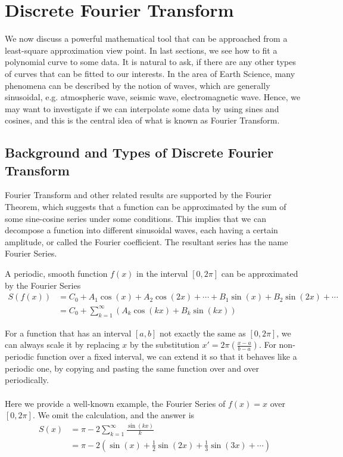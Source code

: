\chapter{Discrete Fourier Transform}
We now discuss a powerful mathematical tool that can be approached from a least-square approximation view point. In last sections, we see how to fit a polynomial curve to some data. It is natural to ask, if there are any other types of curves that can be fitted to our interests. In the area of Earth Science, many phenomena can be described by the notion of waves, which are generally sinusoidal, e.g. atmospheric wave, seismic wave, electromagnetic wave. Hence, we may want to investigate if we can interpolate some data by using sines and cosines, and this is the central idea of what is known as Fourier Transform.

\section{Background and Types of Discrete Fourier Transform}
Fourier Transform and other related results are supported by the Fourier Theorem, which suggests that a function can be approximated by the sum of some sine-cosine series under some conditions. This implies that we can decompose a function into different sinusoidal waves, each having a certain amplitude, or called the Fourier coefficient. The resultant series has the name Fourier Series.
\begin{thm}
A periodic, smooth function $f(x)$ in the interval $[0,2\pi]$ can be approximated by the Fourier Series
\begin{align*}
S(f(x)) &= C_0 + A_1 \cos(x) + A_2 \cos(2x) + \cdots + B_1 \sin(x) + B_2 \sin(2x) + \cdots \\
&= C_0 + \sum_{k=1}^{\infty} (A_k \cos(kx) + B_k \sin(kx))
\end{align*}
\end{thm}
For a function that has an interval $[a,b]$ not exactly the same as $[0,2\pi]$, we can always scale it by replacing $x$ by the substitution $x' = 2\pi(\frac{x-a}{b-a})$. For non-periodic function over a fixed interval, we can extend it so that it behaves like a periodic one, by copying and pasting the same function over and over periodically.\\
\\
Here we provide a well-known example, the Fourier Series of $f(x) = x$ over $[0, 2\pi]$. We omit the calculation, and the answer is
\begin{align*}
S(x) &= \pi - 2 \sum_{k=1}^{\infty} \frac{\sin(kx)}{k} \\
&= \pi - 2 (\sin(x) + \frac{1}{2} \sin(2x) + \frac{1}{3} \sin(3x) + \cdots)
\end{align*}

